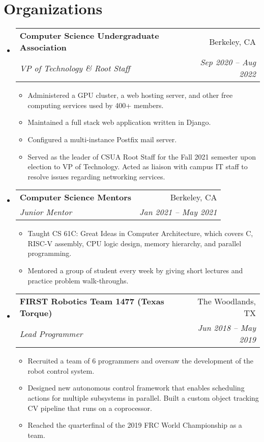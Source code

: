 \documentclass[letterpaper,11pt]{article}
\makeatletter
\newcommand{\resumeItem}[1]{
  \item\small{
    {#1 \vspace{-2pt}}
  }
}
\newcommand{\resumeSubheading}[4]{
  \vspace{-2pt}\item
    \begin{tabular*}{0.97\textwidth}[t]{l@{\extracolsep{\fill}}r}
      \textbf{#1} & #2 \\
      \textit{\small#3} & \textit{\small #4} \\
    \end{tabular*}\vspace{-7pt}
}
\newcommand{\resumeSubHeadingListStart}{\begin{itemize}[leftmargin=0.15in, label={}]}
\newcommand{\resumeSubHeadingListEnd}{\end{itemize}}
\newcommand{\resumeItemListStart}{\begin{itemize}}
\newcommand{\resumeItemListEnd}{\end{itemize}\vspace{-5pt}}
\makeatother
\begin{document}
\section{Organizations}
  \vspace{3pt}
  \resumeSubHeadingListStart
    
    \resumeSubheading
      {Computer Science Undergraduate Association}{Berkeley, CA}
      {VP of Technology \& Root Staff}{Sep 2020 -- Aug 2022}
        \resumeItemListStart
            \resumeItem{Administered a GPU cluster, a web hosting server, and other free computing services used by 400+ members.}
            \resumeItem{Maintained a full stack web application written in Django.}
            \resumeItem{Configured a multi-instance Postfix mail server.}
            \resumeItem{Served as the leader of CSUA Root Staff for the Fall 2021 semester upon election to VP of Technology. Acted as liaison with campus IT staff to resolve issues regarding networking services.}
        \resumeItemListEnd
    
    \filbreak

    \resumeSubheading
      {Computer Science Mentors}{Berkeley, CA}
      {Junior Mentor}{Jan 2021 -- May 2021}
        \resumeItemListStart
            \resumeItem{Taught CS 61C: Great Ideas in Computer Architecture, which covers C, RISC-V assembly, CPU logic design, memory hierarchy, and parallel programming.}
            \resumeItem{Mentored a group of student every week by giving short lectures and practice problem walk-throughs.}
        \resumeItemListEnd
    
    \resumeSubheading
      {FIRST Robotics Team 1477 (Texas Torque)}{The Woodlands, TX}
      {Lead Programmer}{Jun 2018 -- May 2019}
        \resumeItemListStart
            \resumeItem{Recruited a team of 6 programmers and oversaw the development of the robot control system.}
            \resumeItem{Designed new autonomous control framework that enables scheduling actions for multiple subsystems in parallel. Built a custom object tracking CV pipeline that runs on a coprocessor.}
            \resumeItem{Reached the quarterfinal of the 2019 FRC World Championship as a team.}
        \resumeItemListEnd
    
  \resumeSubHeadingListEnd




\end{document}
